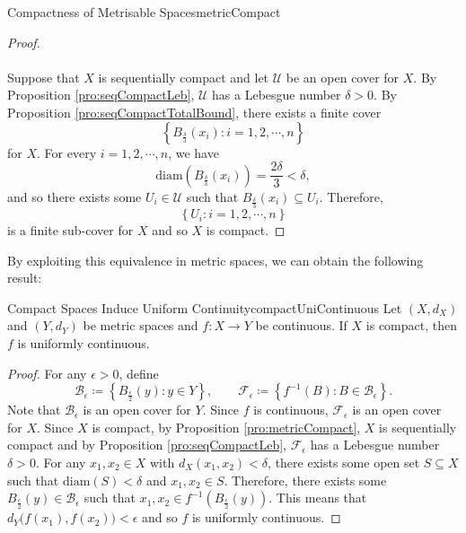 \documentclass[math]{amznotes}
\theoremstyle{remark}
\begin{document}
\begin{probox}{Compactness of Metrisable Spaces}{metricCompact}
\begin{proof}
        \\\\
        Suppose that $X$ is sequentially compact and let $\mathcal{U}$ be an open cover for $X$. By Proposition \ref{pro:seqCompactLeb}, $\mathcal{U}$ has a Lebesgue number $\delta > 0$. By Proposition \ref{pro:seqCompactTotalBound}, there exists a finite cover 
        \begin{equation*}
            \left\{B_{\frac{\delta}{3}}\left(x_i\right) \colon i = 1, 2, \cdots, n\right\}
        \end{equation*}
        for $X$. For every $i = 1, 2, \cdots, n$, we have 
        \begin{equation*}
            \mathrm{diam}\left(B_{\frac{\delta}{3}}\left(x_i\right)\right) = \frac{2\delta}{3} < \delta,
        \end{equation*}
        and so there exists some $U_i \in \mathcal{U}$ such that $B_{\frac{\delta}{3}}\left(x_i\right) \subseteq U_i$. Therefore, 
        \begin{equation*}
            \left\{U_i \colon i = 1, 2, \cdots, n\right\}
        \end{equation*}
        is a finite sub-cover for $X$ and so $X$ is compact.
    \end{proof}
\end{probox} 
By exploiting this equivalence in metric spaces, we can obtain the following result:
\begin{probox}{Compact Spaces Induce Uniform Continuity}{compactUniContinuous}
    Let $\left(X, d_X\right)$ and $\left(Y, d_Y\right)$ be metric spaces and $f \colon X \to Y$ be continuous. If $X$ is compact, then $f$ is uniformly continuous.
    \tcblower
    \begin{proof}
        For any $\epsilon > 0$, define 
        \begin{equation*}
            \mathcal{B}_{\epsilon} \coloneqq \left\{B_{\frac{\epsilon}{2}}\left(y\right) \colon y \in Y\right\}, \qquad \mathcal{F}_{\epsilon} \coloneqq \left\{f^{-1}\left(B\right) \colon B \in \mathcal{B}_{\epsilon}\right\}.
        \end{equation*}
        Note that $\mathcal{B}_{\epsilon}$ is an open cover for $Y$. Since $f$ is continuous, $\mathcal{F}_{\epsilon}$ is an open cover for $X$. Since $X$ is compact, by Proposition \ref{pro:metricCompact}, $X$ is sequentially compact and by Proposition \ref{pro:seqCompactLeb}, $\mathcal{F}_{\epsilon}$ has a Lebesgue number $\delta > 0$. For any $x_1, x_2 \in X$ with $d_X\left(x_1, x_2\right) < \delta$, there exists some open set $S \subseteq X$ such that $\mathrm{diam}\left(S\right) < \delta$ and $x_1, x_2 \in S$. Therefore, there exists some $B_{\frac{\epsilon}{2}}\left(y\right) \in \mathcal{B}_{\epsilon}$ such that $x_1, x_2 \in f^{-1}\left(B_{\frac{\epsilon}{2}}\left(y\right)\right)$. This means that~$d_Y\bigl(f\left(x_1\right), f\left(x_2\right)\bigr) < \epsilon$ and so $f$ is uniformly continuous.
    \end{proof}
\end{probox}
\end{document}
